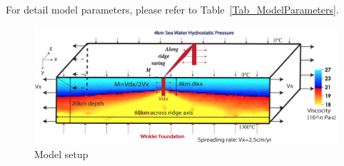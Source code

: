 For detail model parameters, please refer to Table~\hyperref[Tab_ModelParameters]{\ref{Tab_ModelParameters}}.

\begin{figure}[H]
 \centering
  \includegraphics[width=1.0\textwidth] {./Figures/fig_Methods8_1.png}
 \caption{\small Model setup}
 \label{fig_Methods8_1}
\end{figure}


